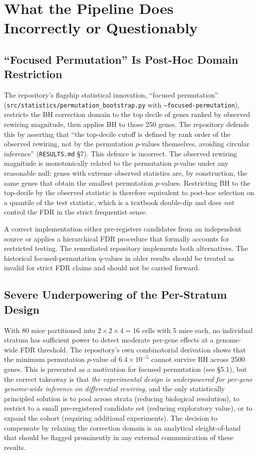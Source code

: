 \documentclass[11pt]{article}
\newcommand{\code}[1]{\texttt{#1}}
\begin{document}
\section{What the Pipeline Does Incorrectly or Questionably}

\subsection{``Focused Permutation'' Is Post-Hoc Domain Restriction}
The repository's flagship statistical innovation, ``focused permutation'' (\code{src/statistics/permutation\_bootstrap.py} with \code{--focused-permutation}), restricts the BH correction domain to the top decile of genes ranked by observed rewiring magnitude, then applies BH to those 250 genes. The repository defends this by asserting that ``the top-decile cutoff is defined by rank order of the observed rewiring, not by the permutation $p$-values themselves, avoiding circular inference'' (\code{RESULTS.md} \S 7). This defence is incorrect. The observed rewiring magnitude is monotonically related to the permutation $p$-value under any reasonable null: genes with extreme observed statistics are, by construction, the same genes that obtain the smallest permutation $p$-values. Restricting BH to the top-decile by the observed statistic is therefore equivalent to post-hoc selection on a quantile of the test statistic, which is a textbook double-dip and does \emph{not} control the FDR in the strict frequentist sense.

A correct implementation either pre-registers candidates from an independent source or applies a hierarchical FDR procedure that formally accounts for restricted testing. The remediated repository implements both alternatives. The historical focused-permutation $q$-values in older results should be treated as invalid for strict FDR claims and should not be carried forward.

\subsection{Severe Underpowering of the Per-Stratum Design}
With 80 mice partitioned into $2{\times}2{\times}4 = 16$ cells with 5 mice each, no individual stratum has sufficient power to detect moderate per-gene effects at a genome-wide FDR threshold. The repository's own combinatorial derivation shows that the minimum permutation $p$-value of $6.4\times 10^{-5}$ cannot survive BH across 2500 genes. This is presented as a motivation for focused permutation (see \S 5.1), but the correct takeaway is that \emph{the experimental design is underpowered for per-gene genome-wide inference on differential rewiring}, and the only statistically principled solution is to pool across strata (reducing biological resolution), to restrict to a small pre-registered candidate set (reducing exploratory value), or to expand the cohort (requiring additional experiments). The decision to compensate by relaxing the correction domain is an analytical sleight-of-hand that should be flagged prominently in any external communication of these results.
\end{document}
